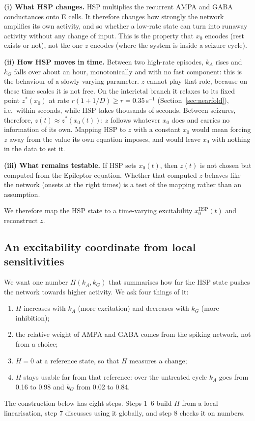 \documentclass[11pt]{article}
\newcommand{\kA}{k_A}
\newcommand{\kG}{k_G}
\newcommand{\xh}{x_0^{\mathrm{HSP}}}
\begin{document}
\textbf{(i) What HSP changes.} HSP multiplies the recurrent AMPA and GABA conductances onto E cells. It therefore changes
how strongly the network amplifies its own activity, and so whether a low-rate state can turn into runaway activity
without any change of input. This is the property that $x_0$ encodes (rest exists or not), not the one $z$ encodes
(where the system is inside a seizure cycle).

\textbf{(ii) How HSP moves in time.} Between two high-rate episodes, $\kA$ rises and $\kG$ falls over about an hour,
monotonically and with no fast component: this is the behaviour of a slowly varying parameter. $z$ cannot play that
role, because on these time scales it is not free. On the interictal branch it relaxes to its fixed point
$z^*(x_0)$ at rate $r(1+1/D)\ge r = 0.35$\,s$^{-1}$ (Section~\ref{sec:nearfold}), i.e.\ within seconds, while HSP takes
thousands of seconds. Between seizures, therefore, $z(t)\approx z^*(x_0(t))$: $z$ follows whatever $x_0$ does and carries
no information of its own. Mapping HSP to $z$ with a constant $x_0$ would mean forcing $z$ away from the value its own
equation imposes, and would leave $x_0$ with nothing in the data to set it.

\textbf{(iii) What remains testable.} If HSP sets $x_0(t)$, then $z(t)$ is not chosen but computed from the Epileptor
equation. Whether that computed $z$ behaves like the network (onsets at the right times) is a test of the mapping
rather than an assumption.

We therefore map the HSP state to a time-varying excitability $\xh(t)$ and reconstruct $z$.

\subsection{An excitability coordinate from local sensitivities}\label{sec:Hderiv}
We want one number $H(\kA,\kG)$ that summarises how far the HSP state pushes the network towards higher activity.
We ask four things of it:
\begin{enumerate}[label=(P\arabic*)]
\item $H$ increases with $\kA$ (more excitation) and decreases with $\kG$ (more inhibition);
\item the relative weight of AMPA and GABA comes from the spiking network, not from a choice;
\item $H=0$ at a reference state, so that $H$ measures a change;
\item $H$ stays usable far from that reference: over the untreated cycle $\kA$ goes from 0.16 to 0.98 and $\kG$
from 0.02 to 0.84.
\end{enumerate}
The construction below has eight steps. Steps 1--6 build $H$ from a local linearisation, step 7 discusses using it
globally, and step 8 checks it on numbers.
\end{document}
